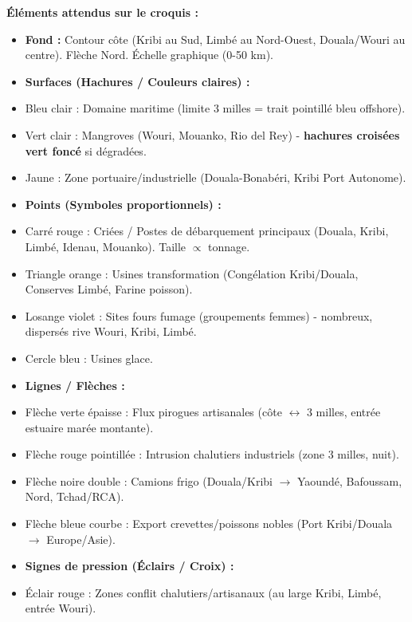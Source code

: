 \documentclass[11pt]{article}
\begin{document}
\begin{corrige}
\textbf{Éléments attendus sur le croquis :}
\begin{itemize}
\item \textbf{Fond :} Contour côte (Kribi au Sud, Limbé au Nord-Ouest, Douala/Wouri au centre). Flèche Nord. Échelle graphique (0-50 km).
\item \textbf{Surfaces (Hachures / Couleurs claires) :}
    \item \textcolor{popblue!30}{Bleu clair} : Domaine maritime (limite 3 milles = trait pointillé bleu offshore).
    \item \textcolor{popgreen!30}{Vert clair} : Mangroves (Wouri, Mouanko, Rio del Rey) - \textbf{hachures croisées vert foncé} si dégradées.
    \item \textcolor{popyellow!30}{Jaune} : Zone portuaire/industrielle (Douala-Bonabéri, Kribi Port Autonome).
\item \textbf{Points (Symboles proportionnels) :}
    \item \textcolor{popred}{Carré rouge} : Criées / Postes de débarquement principaux (Douala, Kribi, Limbé, Idenau, Mouanko). Taille $\propto$ tonnage.
    \item \textcolor{poporange}{Triangle orange} : Usines transformation (Congélation Kribi/Douala, Conserves Limbé, Farine poisson).
    \item \textcolor{poppurple}{Losange violet} : Sites fours fumage (groupements femmes) - nombreux, dispersés rive Wouri, Kribi, Limbé.
    \item \textcolor{popblue}{Cercle bleu} : Usines glace.
\item \textbf{Lignes / Flèches :}
    \item \textcolor{popgreen}{Flèche verte épaisse} : Flux pirogues artisanales (côte $\leftrightarrow$ 3 milles, entrée estuaire marée montante).
    \item \textcolor{popred}{Flèche rouge pointillée} : Intrusion chalutiers industriels (zone 3 milles, nuit).
    \item \textcolor{popdark}{Flèche noire double} : Camions frigo (Douala/Kribi $\rightarrow$ Yaoundé, Bafoussam, Nord, Tchad/RCA).
    \item \textcolor{popblue}{Flèche bleue courbe} : Export crevettes/poissons nobles (Port Kribi/Douala $\rightarrow$ Europe/Asie).
\item \textbf{Signes de pression (Éclairs / Croix) :}
    \item \textcolor{popred}{Éclair rouge} : Zones conflit chalutiers/artisanaux (au large Kribi, Limbé, entrée Wouri).

\end{itemize}
\end{corrige}
\end{document}
